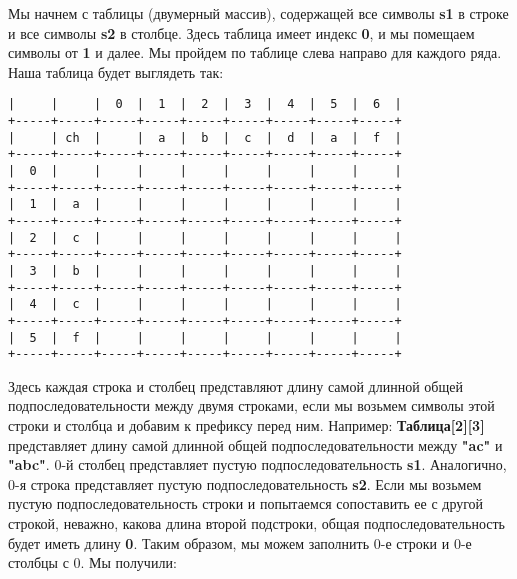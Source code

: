 Мы начнем с таблицы (двумерный массив), содержащей все символы \textbf{s1} в
строке и все символы \textbf{s2} в столбце. Здесь таблица имеет индекс \textbf{0}, и мы
помещаем символы от \textbf{1} и далее. Мы пройдем по таблице слева направо для
каждого ряда. Наша таблица будет выглядеть так:
\vspace{\baselineskip}
\begin{tcolorbox}
\begin{verbatim}
|     |     |  0  |  1  |  2  |  3  |  4  |  5  |  6  |
+-----+-----+-----+-----+-----+-----+-----+-----+-----+
|     | ch  |     |  a  |  b  |  c  |  d  |  a  |  f  |
+-----+-----+-----+-----+-----+-----+-----+-----+-----+
|  0  |     |     |     |     |     |     |     |     |
+-----+-----+-----+-----+-----+-----+-----+-----+-----+
|  1  |  a  |     |     |     |     |     |     |     |
+-----+-----+-----+-----+-----+-----+-----+-----+-----+
|  2  |  c  |     |     |     |     |     |     |     |
+-----+-----+-----+-----+-----+-----+-----+-----+-----+
|  3  |  b  |     |     |     |     |     |     |     |
+-----+-----+-----+-----+-----+-----+-----+-----+-----+
|  4  |  c  |     |     |     |     |     |     |     |
+-----+-----+-----+-----+-----+-----+-----+-----+-----+
|  5  |  f  |     |     |     |     |     |     |     |
+-----+-----+-----+-----+-----+-----+-----+-----+-----+
\end{verbatim}
\end{tcolorbox}
\vspace{\baselineskip}
Здесь каждая строка и столбец представляют длину самой длинной общей
подпоследовательности между двумя строками, если мы возьмем символы
этой строки и столбца и добавим к префиксу перед ним. Например: \textbf{Таблица[2][3]} представляет длину самой длинной общей подпоследовательности
между \textbf{"ac"} и \textbf{"abc"}.
0-й столбец представляет пустую подпоследовательность \textbf{s1}. Аналогично, 0-я
строка представляет пустую подпоследовательность \textbf{s2}. Если мы возьмем
пустую подпоследовательность строки и попытаемся сопоставить ее с другой
строкой, неважно, какова длина второй подстроки, общая
подпоследовательность будет иметь длину \textbf{0}. Таким образом, мы можем
заполнить 0-е строки и 0-е столбцы с 0. Мы получили:
\vspace{\baselineskip}
